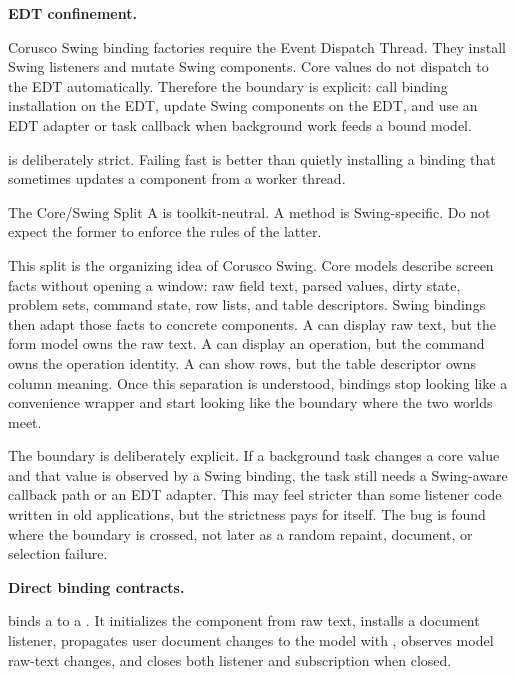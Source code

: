 \textbf{EDT confinement.}

Corusco Swing binding factories require the Event Dispatch Thread. They install
Swing listeners and mutate Swing components. Core values do not dispatch to the
EDT automatically. Therefore the boundary is explicit: call binding installation
on the EDT, update Swing components on the EDT, and use an EDT adapter or task
callback when background work feeds a bound model.

 is deliberately strict. Failing fast is better than
quietly installing a binding that sometimes updates a component from a worker
thread.

\begin{pitfallbox}{The Core/Swing Split}
A  is toolkit-neutral. A  method is
Swing-specific. Do not expect the former to enforce the rules of the latter.
\end{pitfallbox}

This split is the organizing idea of Corusco Swing. Core models describe screen
facts without opening a window: raw field text, parsed values, dirty state,
problem sets, command state, row lists, and table descriptors. Swing bindings
then adapt those facts to concrete components. A  can display
raw text, but the form model owns the raw text. A  can display an
operation, but the command owns the operation identity. A  can show
rows, but the table descriptor owns column meaning. Once this separation is
understood, bindings stop looking like a convenience wrapper and start looking
like the boundary where the two worlds meet.

The boundary is deliberately explicit. If a background task changes a core
value and that value is observed by a Swing binding, the task still needs a
Swing-aware callback path or an EDT adapter. This may feel stricter than some
listener code written in old applications, but the strictness pays for itself.
The bug is found where the boundary is crossed, not later as a random repaint,
document, or selection failure.

\textbf{Direct binding contracts.}

 binds a  to a
. It initializes the component from raw text, installs a
document listener, propagates user document changes to the model with
, observes model raw-text changes, and closes both
listener and subscription when closed.

